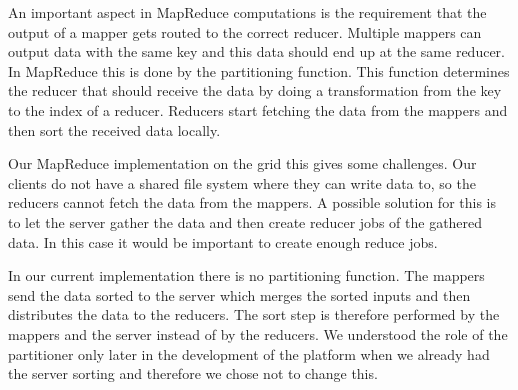 An important aspect in MapReduce computations is the requirement that the output of a mapper
gets routed to the correct reducer.
Multiple mappers can output data with the same key and this data should end up
at the same reducer.
In MapReduce this is done by the partitioning function. This function determines
the reducer that should receive the data by doing a transformation from the key
to the index of a reducer. Reducers start fetching the data from the mappers and
then sort the received data locally.

Our MapReduce implementation on the grid this gives some challenges.
Our clients do not have a shared file system where they can write data to, so
the reducers cannot fetch the data from the mappers.
A possible solution for this is to let the server gather the data and then
create reducer jobs of the gathered data.
In this case it would be important to create enough reduce jobs.

In our current implementation there is no partitioning function. The mappers
send the data sorted to the server which merges the sorted inputs
and then distributes the data to the reducers. The sort step is therefore
performed by the mappers and the server instead of by the reducers.
We understood the role of the partitioner only later in the development of the platform
when we already had the server sorting and therefore we chose not to change this.